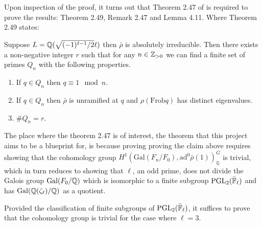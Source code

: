 


Upon inspection of the proof, it turns out that Theorem 2.47 of \cite{dtt} is required to prove the results: Theorem 2.49, Remark 2.47 and Lemma 4.11. Where Theorem 2.49 states:

\begin{theorem}[Theorem 2.49]
    Suppose $L = \mathbb{Q}(\sqrt{(-1)^{\ell -1}/2} \ell)$ then $\bar{\rho}$ is absolutely irreducible. Then
    there exists a non-negative integer $r$ such that for any $n \in \mathbb{Z}_{>0}$ we can find a
    finite set of primes $Q_n$ with the following properties.
    \begin{enumerate}
        \item If $q \in Q_n$ then $q \equiv 1 \mod n$.
        \item If $q \in Q_n$ then $\bar{\rho}$ is unramified at $q$ and $\rho(\textrm{Frob}q)$ has distinct eigenvalues.
        \item $\# Q_n = r$.
    \end{enumerate}
\end{theorem}

The place where the theorem 2.47 is of interest, the theorem that this project aims to be a blueprint for, is because proving proving the claim above requires showing that the 
cohomology group  $H^1(\textrm{Gal}(F_n / F_0), \textrm{ad}^0\bar{\rho}(1))^G_{\mathbb{Q}}$ is trivial, which in turn reduces to showing that $\ell$, an odd prime, does not divide the Galois group $\operatorname{Gal}(F_0 /\mathbb{Q})$ which is isomorphic to a finite subgroup $\operatorname{PGL}_2(\bar{\mathbb{F}}_\ell)$
and has $\operatorname{Gal}(\mathbb{Q}(\zeta_\ell)/\mathbb{Q})$ as a quotient.

Provided the classification of finite subgroups of $\operatorname{PGL}_2(\bar{\mathbb{F}}_\ell)$, it suffices to prove that the cohomology group is trivial for the case where $\ell = 3$.



